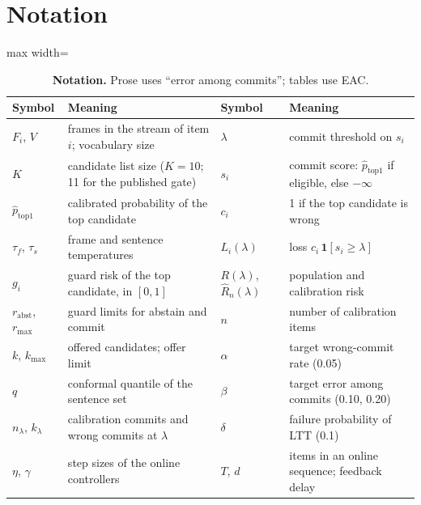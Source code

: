 
\section{Notation}
\label{app:notation}

\begin{table}[H]
  \centering
  \caption{\textbf{Notation.} Prose uses ``error among commits''; tables use EAC.}
  \label{tab:notation}
  \small
  \begin{adjustbox}{max width=\linewidth}\begin{tabular}{@{}ll@{\qquad}ll@{}}
    \toprule
    \textbf{Symbol} & \textbf{Meaning} & \textbf{Symbol} & \textbf{Meaning} \\
    \midrule
    $F_i$, $V$ & frames in the stream of item $i$; vocabulary size & $\lambda$ & commit threshold on $s_i$ \\
    $K$ & candidate list size ($K = 10$; 11 for the published gate) & $s_i$ & commit score: $\hat p_{\mathrm{top1}}$ if eligible, else $-\infty$ \\
    $\hat p_{\mathrm{top1}}$ & calibrated probability of the top candidate & $c_i$ & 1 if the top candidate is wrong \\
    $\tau_f$, $\tau_s$ & frame and sentence temperatures & $L_i(\lambda)$ & loss $c_i\,\mathbf{1}[s_i \ge \lambda]$ \\
    $g_i$ & guard risk of the top candidate, in $[0,1]$ & $R(\lambda)$, $\hat R_n(\lambda)$ & population and calibration risk \\
    $r_{\mathrm{abst}}$, $r_{\mathrm{max}}$ & guard limits for abstain and commit & $n$ & number of calibration items \\
    $k$, $k_{\max}$ & offered candidates; offer limit & $\alpha$ & target wrong-commit rate (0.05) \\
    $q$ & conformal quantile of the sentence set & $\beta$ & target error among commits (0.10, 0.20) \\
    $n_\lambda$, $k_\lambda$ & calibration commits and wrong commits at $\lambda$ & $\delta$ & failure probability of LTT (0.1) \\
    $\eta$, $\gamma$ & step sizes of the online controllers & $T$, $d$ & items in an online sequence; feedback delay \\
    \bottomrule
  \end{tabular}\end{adjustbox}
\end{table}

